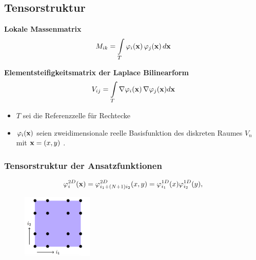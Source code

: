 \subsection{Tensorstruktur}

\begin{frame}

\begin{framed}
\textbf{Lokale Massenmatrix}
\begin{equation*} \label{eq:mass}
M_{ik} = \int\limits_{T} \varphi_i (\bold{x}) \, \varphi_j (\bold{x}) \, d\bold{x}
\end{equation*}

\textbf{Elementsteifigkeitsmatrix der Laplace Bilinearform}
\begin{equation*}
V_{ij} = \int\limits_{T} \nabla \varphi_i(\bold{x}) \, \nabla \varphi_j(\bold{x})  d \bold{x}
\end{equation*}
\end{framed}

\begin{itemize}
\item $T$ sei die Referenzzelle für Rechtecke
\item $\varphi_i(\bold{x})$ seien zweidimensionale reelle Basisfunktion des diskreten Raumes $V_n$ mit $\bold{x}=(x,y)$ .
\end{itemize}

\end{frame}



\begin{frame}
\frametitle{Tensorstruktur der Ansatzfunktionen}

\begin{equation*} \label{eq:tensor}
\varphi^{2D}_i(\bold{x})=\varphi^{2D}_{i_1+(N+1)i_2}(x,y)=\varphi^{1D}_{i_1}(x)\varphi^{1D}_{i_2}(y),
\end{equation*}

\begin{figure}[ht] 
	\centering
  \includegraphics[width=0.3\textwidth]{lexi.png}
	\caption{ \cite[3]{Teachlet}}
	\label{fig:lexi}
\end{figure}


\end{frame}

